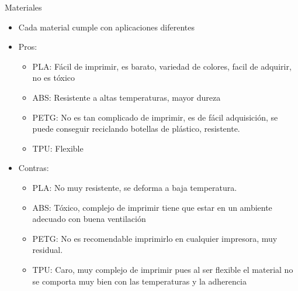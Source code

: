 \documentclass{beamer}
\begin{document}
\begin{frame}{Materiales}
    \begin{itemize}
        \item Cada material cumple con aplicaciones diferentes
        \item Pros:
        \begin{itemize}
            \item PLA: F\'acil de imprimir, es barato, variedad de colores, facil de adquirir, no es t\'oxico
            \item ABS: Resistente a altas temperaturas, mayor dureza
            \item PETG: No es tan complicado de imprimir, es de f\'acil adquisici\'on, se puede conseguir reciclando botellas de pl\'astico, resistente.
            \item TPU: Flexible
        \end{itemize}
        \item Contras:
                \begin{itemize}
            \item PLA: No muy resistente, se deforma a baja temperatura.
            \item ABS: T\'oxico, complejo de imprimir tiene que estar en un ambiente adecuado con buena ventilaci\'on
            \item PETG: No es recomendable imprimirlo en cualquier impresora, muy residual.
            \item TPU: Caro, muy complejo de imprimir pues al ser flexible el material no se comporta muy bien con las temperaturas y la adherencia
        \end{itemize}
        
    \end{itemize}
\end{frame}

\end{document}
